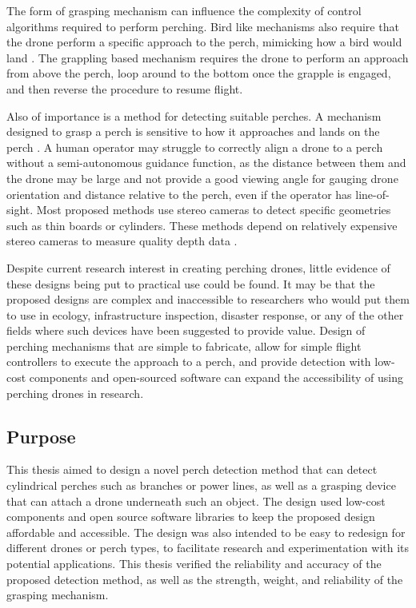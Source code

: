 The form of grasping mechanism can influence the complexity of control algorithms required to perform perching. 
Bird like mechanisms also require that the drone perform a specific approach to the perch, mimicking how a bird
would land \cite{roderick_bird-inspired_2021}. The grappling based mechanism requires the drone to perform an approach 
from above the perch, loop around to the bottom once the grapple is engaged, and then reverse the procedure to 
resume flight.

Also of importance is a method for detecting suitable perches. A mechanism designed to grasp a perch is sensitive to how
it approaches and lands on the perch \cite{roderick_bird-inspired_2021,kirchgeorg_hedgehog_2022}. A human operator may struggle
to correctly align a drone to a perch without a semi-autonomous guidance function, as the distance between them and the drone may be 
large and not provide a good viewing angle for gauging drone orientation and distance relative to the perch, even if the operator has line-of-sight. 
Most proposed methods use stereo cameras to detect specific geometries such as thin boards or cylinders. These methods depend on relatively 
expensive stereo cameras to measure quality depth data \cite{kominami_detection_2023,von_frankenberg_detection_2020}.

Despite current research interest in creating perching drones, little evidence of these designs being put to practical use could be found. 
It may be that the proposed designs are complex and inaccessible to researchers who would put them to use in ecology, infrastructure inspection,
disaster response, or any of the other fields where such devices have been suggested to provide value. 
Design of perching mechanisms that are simple to fabricate, allow for simple flight controllers to execute the approach to a perch, 
and provide detection with low-cost components and open-sourced software can expand the accessibility of using perching drones in research.


\subsection{Purpose}

This thesis aimed to design a novel perch detection method that can detect cylindrical perches such as branches or power lines, 
as well as a grasping device that can attach a drone underneath such an object. The design used low-cost components and open source
software libraries to keep the proposed design affordable and accessible. The design was also intended to be easy to redesign for different drones
or perch types, to facilitate research and experimentation with its potential applications.
This thesis verified the reliability and accuracy
of the proposed detection method, as well as the strength, weight, and reliability of the grasping mechanism. 


